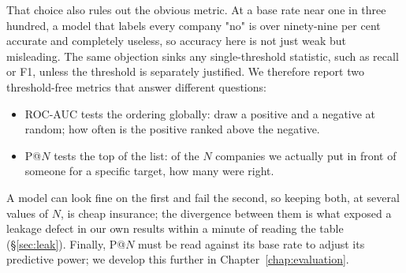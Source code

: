 \documentclass[    author={Samuel Menon Demelo; Sneha Saphala Ram Prasad; 
Viktor Ander Lindholm; Vishal Khatri},
               supervisor={Prof. Fernando Moreno-Pino},
                   degree={MSc},
                    title={Lloyds Commercial Banking Intelligence},
                 subtitle={Ranking SME Lending, Risk and Growth Prospects for Lloyds Banking Group},
                     type={},
                     year={2026}]{dissertation}
\begin{document}
That choice also rules out the obvious metric. At a base rate near one in three hundred, a model that labels every company "no" is over ninety-nine per cent accurate and completely useless, so accuracy here is not just weak but misleading. The same objection sinks any single-threshold statistic, such as
recall or F1, unless the threshold is separately justified. We therefore report two threshold-free metrics that answer different questions:
\begin{itemize}
    \item ROC-AUC \cite{FAWCETT2006861} tests the ordering globally: draw a positive and a negative at random; how often is the positive ranked above the negative.
    \item P@$N$ \cite{manning2008introduction} tests the top of the list: of the $N$ companies we actually put in front of someone for a specific target, how many were right.
\end{itemize}
A model can look fine on the first and fail the second, so keeping both, at several values of $N$, is cheap insurance; the divergence between them is what exposed a leakage defect in our own results within a minute of reading the table (\S\ref{sec:leak}). Finally, P@$N$ must be read against its base rate to adjust its predictive power; we develop this further in Chapter~\ref{chap:evaluation}.
\end{document}
